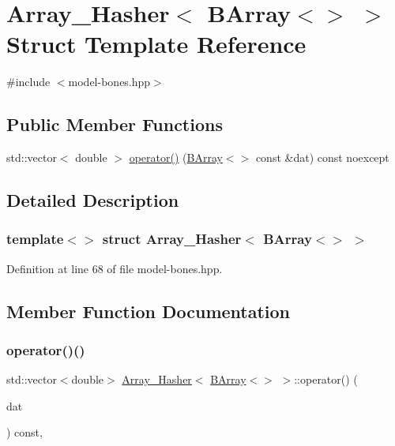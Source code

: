 \hypertarget{struct_array___hasher_3_01_b_array_3_4_01_4}{}\section{Array\+\_\+\+Hasher$<$ B\+Array$<$$>$ $>$ Struct Template Reference}
\label{struct_array___hasher_3_01_b_array_3_4_01_4}


{\ttfamily \#include $<$model-\/bones.\+hpp$>$}

\subsection*{Public Member Functions}
\begin{DoxyCompactItemize}
\item 
std\+::vector$<$ double $>$ \hyperlink{struct_array___hasher_3_01_b_array_3_4_01_4_a5a40ad373242142e6e8ca77611fb1be3}{operator()} (\hyperlink{class_b_array}{B\+Array}$<$$>$ const \&dat) const noexcept
\end{DoxyCompactItemize}


\subsection{Detailed Description}
\subsubsection*{template$<$$>$\newline
struct Array\+\_\+\+Hasher$<$ B\+Array$<$$>$ $>$}



Definition at line 68 of file model-\/bones.\+hpp.



\subsection{Member Function Documentation}
\mbox{\label{struct_array___hasher_3_01_b_array_3_4_01_4_a5a40ad373242142e6e8ca77611fb1be3}} 
\subsubsection{\texorpdfstring{operator()()}{operator()()}}
{\footnotesize\ttfamily std\+::vector$<$double$>$ \hyperlink{struct_array___hasher}{Array\+\_\+\+Hasher}$<$ \hyperlink{class_b_array}{B\+Array}$<$$>$ $>$\+::operator() (\begin{DoxyParamCaption}\item[{\hyperlink{class_b_array}{B\+Array}$<$$>$ const \&}]{dat }\end{DoxyParamCaption}) const\hspace{0.3cm}{\ttfamily [inline]}, {\ttfamily [noexcept]}}



